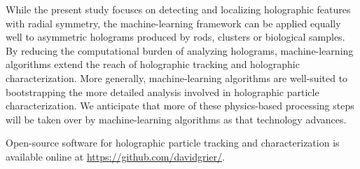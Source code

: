 While the present study focuses on detecting and localizing
holographic features with radial symmetry,
the machine-learning framework can be applied equally well to
asymmetric holograms produced by rods, clusters
or biological samples.
By reducing the computational burden of analyzing holograms,
machine-learning algorithms extend the reach of holographic
tracking and holographic characterization.
More generally, machine-learning algorithms are well-suited to bootstrapping
the more detailed analysis involved in holographic particle
characterization.
We anticipate that more of these physics-based
processing steps will be taken over by machine-learning algorithms
as that technology advances.

Open-source software for holographic particle tracking and characterization
is available online at \url{https://github.com/davidgrier/}.

